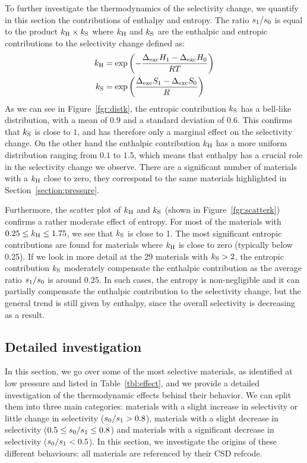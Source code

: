 \documentclass[main.tex]{subfiles}
\begin{document}
  To further investigate the thermodynamics of the selectivity change, we quantify in this section the contributions of enthalpy and entropy. The ratio ${s_{\text{1}}}/{s_{\text{0}}}$ is equal to the product $k_{\text{H}} \times k_{\text{S}}$ where $k_{\text{H}}$ and $k_{\text{S}}$ are the enthalpic and entropic contributions to the selectivity change defined as:
  \begin{equation}
  \label{eqn:effects}
      \begin{split}
       k_{\text{H}} & = \exp\left(-\dfrac{\Delta_{\text{exc}}H_{\text{1}}-\Delta_{\text{exc}}H_{\text{0}}}{RT}\right) \\ k_{\text{S}} & = \exp\left(\dfrac{\Delta_{\text{exc}}S_{\text{1}}-\Delta_{\text{exc}}S_{\text{0}}}{R}\right)
      \end{split}
  \end{equation}
  As we can see in Figure~\ref{fgr:distk}, the entropic contribution $k_{\text{S}}$ has a bell-like distribution, with a mean of $0.9$ and a standard deviation of $0.6$. This confirms that $k_{\text{S}}$ is close to $1$, and has therefore only a marginal effect on the selectivity change. On the other hand the enthalpic contribution $k_{\text{H}}$ has a more uniform distribution ranging from $0.1$ to $1.5$, which means that enthalpy has a crucial role in the selectivity change we observe. There are a significant number of materials with a $k_{\text{H}}$ close to zero, they correspond to the same materials highlighted in Section~\ref{section:pressure}.
  
  Furthermore, the scatter plot of $k_{\text{H}}$ and $k_{\text{S}}$ (shown in Figure~\ref{fgr:scatterk}) confirms a rather moderate effect of entropy. For most of the materials with $0.25 \le k_{\text{H}} \le 1.75$, we see that $k_{\text{S}}$ is close to 1. The most significant entropic contributions are found for materials where $k_{\text{H}}$ is close to zero (typically below 0.25). If we look in more detail at the 29 materials with $k_{\text{S}}>2$, the entropic contribution $k_{\text{S}}$ moderately compensate the enthalpic contribution as the average ratio $s_{\text{1}}/s_{\text{0}}$ is around $0.25$. In such cases, the entropy is non-negligible and it can partially compensate the enthalpic contribution to the selectivity change, but the general trend is still given by enthalpy, since the overall selectivity is decreasing as a result.
  
  
  \subsection{Detailed investigation}
  \label{sec:archetypes}
  
  In this section, we go over some of the most selective materials, as identified at low pressure and listed in Table~\ref{tbl:effect}, and we provide a detailed investigation of the thermodynamic effects behind their behavior. We can split them into three main categories: materials with a slight increase in selectivity or little change in selectivity ($s_{\text{0}}/s_{\text{1}} > 0.8$), materials with a slight decrease in selectivity ($0.5 \le s_{\text{0}}/s_{\text{1}} \le 0.8$) and materials with a significant decrease in selectivity ($s_{\text{0}}/s_{\text{1}} < 0.5$). In this section, we investigate the origins of these different behaviours: all materials are referenced by their CSD refcode.
  
\end{document}

